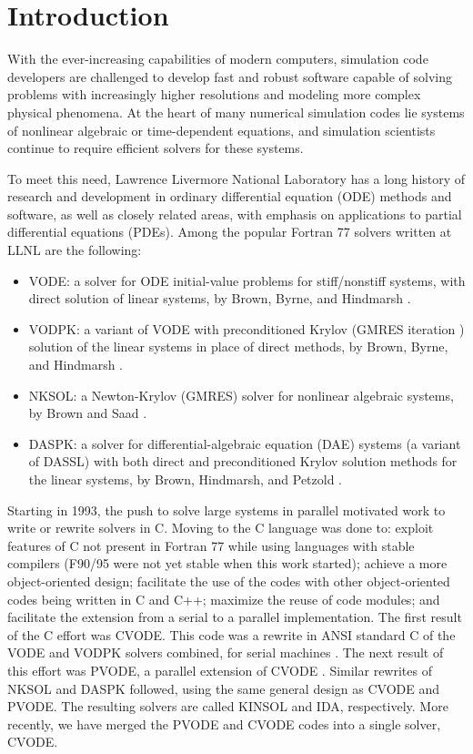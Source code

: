 \section{Introduction}

With the ever-increasing capabilities of modern computers, simulation
code developers are challenged to develop fast and robust software
capable of solving problems with increasingly higher resolutions and
modeling more complex
physical phenomena.  At the heart of many numerical simulation codes
lie systems of nonlinear algebraic or time-dependent equations, and
simulation scientists continue to require efficient solvers for these
systems.

To meet this need, Lawrence Livermore National Laboratory
has a long history of research and development in ordinary
differential equation (ODE) methods and software, as well as closely related
areas, with emphasis on applications to partial differential equations
(PDEs).  Among the popular Fortran 77 solvers written at LLNL are the
following:
\begin{itemize}
\item VODE: a solver for ODE initial-value problems for stiff/nonstiff
systems, with direct solution of linear systems, by Brown, Byrne, and
Hindmarsh \cite{BBH:89}.
\item VODPK: a variant of VODE with preconditioned Krylov (GMRES
iteration \cite{SaSc:86}) solution of the linear systems in place
of direct methods, by Brown, Byrne, and Hindmarsh \cite{Byr:92}.
\item NKSOL: a Newton-Krylov (GMRES) solver for nonlinear algebraic
systems, by Brown and Saad \cite{BrSa:90}.
\item DASPK: a solver for differential-algebraic equation (DAE)
systems (a variant of DASSL) with both direct and preconditioned
Krylov solution methods for the linear systems, by Brown, Hindmarsh,
and Petzold \cite{BHP:94}.
\end{itemize}
Starting in 1993, the push to solve large systems in parallel
motivated work to write or rewrite solvers in C. Moving to the C
language was done to: exploit features of C not present in Fortran
77 while using languages with stable compilers (F90/95 were not
yet stable when this work started); achieve a more object-oriented
design; facilitate the use of the codes with other object-oriented
codes being written in C and C++; maximize the reuse of code
modules; and facilitate the extension from a serial to a parallel
implementation. The first result of the C effort was CVODE. This
code was a rewrite in ANSI standard C of the VODE and VODPK
solvers combined, for serial machines \cite{CoHi:94,CoHi:96}.  The
next result of this effort was PVODE, a parallel extension of
CVODE \cite{ByHi:98,ByHi:99}. Similar rewrites of NKSOL and DASPK
followed, using the same general design as CVODE and PVODE.  The
resulting solvers are called KINSOL and IDA, respectively. More
recently, we have merged the PVODE and CVODE codes into a single
solver, CVODE.

